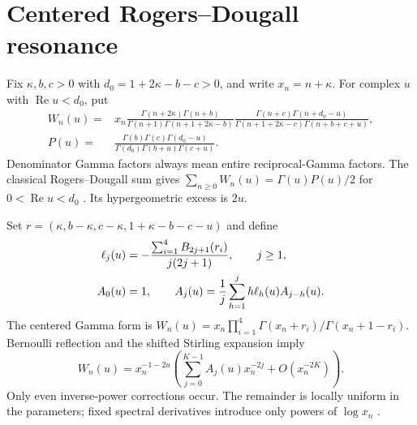 \section{Centered Rogers--Dougall resonance}
\label{dr-core:section}

Fix $\kappa,b,c>0$ with $d_0=1+2\kappa-b-c>0$, and write $x_n=n+\kappa$.
For complex $u$ with $\operatorname{Re}u<d_0$, put
\begin{align}
 W_n(u)={}&x_n\frac{\Gamma(n+2\kappa)\Gamma(n+b)}
 {\Gamma(n+1)\Gamma(n+1+2\kappa-b)}
 \frac{\Gamma(n+c)\Gamma(n+d_0-u)}
 {\Gamma(n+1+2\kappa-c)\Gamma(n+b+c+u)},
 \label{dr-core:weight}\\
 P(u)={}&\frac{\Gamma(b)\Gamma(c)\Gamma(d_0-u)}
 {\Gamma(d_0)\Gamma(b+u)\Gamma(c+u)}.
 \label{dr-core:P}
\end{align}
Denominator Gamma factors always mean entire reciprocal-Gamma factors.
The classical Rogers--Dougall sum gives
$\sum_{n\geq0}W_n(u)=\Gamma(u)P(u)/2$ for $0<\operatorname{Re}u<d_0$
\cite{dougall-resonance:DLMF16}. Its hypergeometric excess is $2u$.

Set $r=(\kappa,b-\kappa,c-\kappa,1+\kappa-b-c-u)$ and define
\begin{align}
 \ell_j(u)&=-\frac{\sum_{i=1}^4B_{2j+1}(r_i)}{j(2j+1)},\qquad j\geq1,
 \notag\\
 A_0(u)&=1,\qquad
 A_j(u)=\frac1j\sum_{h=1}^j h\ell_h(u)A_{j-h}(u).
 \label{dr-core:A}
\end{align}
The centered Gamma form is
$W_n(u)=x_n\prod_{i=1}^4\Gamma(x_n+r_i)/\Gamma(x_n+1-r_i)$.
Bernoulli reflection and the shifted Stirling expansion imply
\begin{equation}
 W_n(u)=x_n^{-1-2u}\left(\sum_{j=0}^{K-1}A_j(u)x_n^{-2j}
                                    +O(x_n^{-2K})\right).
 \label{dr-core:asymptotic}
\end{equation}
Only even inverse-power corrections occur. The remainder is locally
uniform in the parameters; fixed spectral derivatives introduce only
powers of $\log x_n$ \cite{dougall-resonance:DLMF5}.

